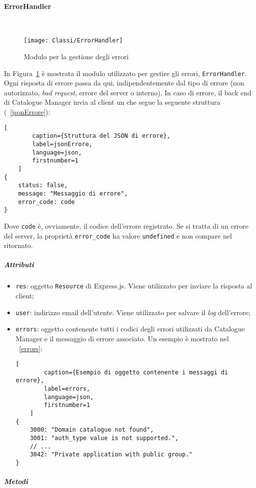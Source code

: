 \paragraph{ErrorHandler} \mbox{} \\
\begin{figure}[hbpc]
  \begin{center}
    \texttt{[image: Classi/ErrorHandler]}
  \caption[Modulo per la gestione degli errori]{Modulo per la gestione degli errori}
  \label{fig:ErrorHandler}
  \end{center} 
\end{figure}
In Figura~\ref{fig:ErrorHandler} è mostrata il modulo utilizzato per gestire gli errori, \texttt{ErrorHandler}. Ogni risposta di errore passa da qui, indipendentemente dal tipo di errore (non autorizzato, \textit{bad request}, errore del server o interno). In caso di errore, il back end di Catalogue Manager invia al client un  che segue la seguente struttura (\lstlistingname~\ref{jsonErrore}):
\begin{lstlisting}[
		caption={Struttura del JSON di errore},
		label=jsonErrore,
		language=json,
		firstnumber=1
	]
{
	status: false,
	message: "Messaggio di errore",
	error_code: code
}
\end{lstlisting}
Dove \texttt{code} è, ovviamente, il codice dell'errore registrato. Se si tratta di un errore del server, la proprietà \texttt{error\_code} ha valore \texttt{undefined} e non compare nel  ritornato. 
\subparagraph{Attributi}
\begin{itemize}
\item \texttt{res}: oggetto \texttt{Resource} di Express.js. Viene utilizzato per inviare la risposta al client;
\item \texttt{user}: indirizzo email dell'utente. Viene utilizzato per salvare il \textit{log} dell'errore;
\item \texttt{errors}: oggetto contenente tutti i codici degli errori utilizzati da Catalogue Manager e il messaggio di errore associato. Un esempio è mostrato nel \lstlistingname~\ref{errors}:
\begin{lstlisting}[
		caption={Esempio di oggetto contenente i messaggi di errore},
		label=errors,
		language=json,
		firstnumber=1
	]
{
	3000: "Domain catalogue not found",
	3001: "auth_type value is not supported.",
	// ...
	3042: "Private application with public group."
}
\end{lstlisting}
\end{itemize}
\subparagraph{Metodi}
